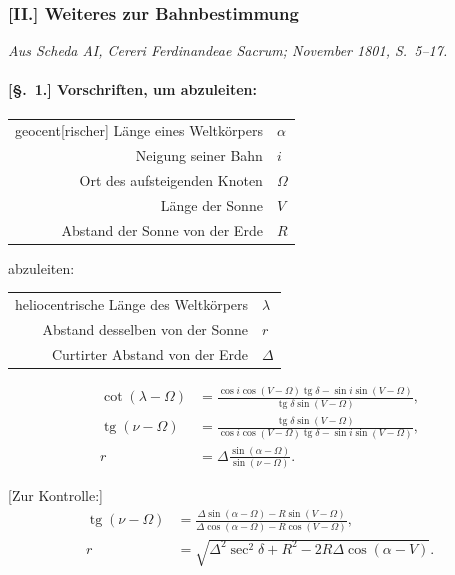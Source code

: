 \documentclass[12pt,a4paper]{article}
\DeclareMathOperator{\tg}{tg}
\theoremstyle{plain}
\theoremstyle{definition}
\theoremstyle{remark}
\begin{document}
\newpage

\subsubsection*{[II.] Weiteres zur Bahnbestimmung}

\textit{Aus Scheda AI, Cereri Ferdinandeae Sacrum; November 1801, S.~5--17.}

\medskip

\paragraph{[§.~1.] Vorschriften, um abzuleiten:}

\begin{center}
\begin{tabular}{r@{\quad}l}
geocent[rischer] Länge eines Weltkörpers & $\alpha$ \\
Neigung seiner Bahn & $i$ \\
Ort des aufsteigenden Knoten & $\Omega$ \\
Länge der Sonne & $V$ \\
Abstand der Sonne von der Erde & $R$
\end{tabular}
\end{center}

abzuleiten:
\begin{center}
\begin{tabular}{r@{\quad}l}
heliocentrische Länge des Weltkörpers & $\lambda$ \\
Abstand desselben von der Sonne & $r$ \\
Curtirter Abstand von der Erde & $\Delta$
\end{tabular}
\end{center}

\begin{align*}
\cot(\lambda - \Omega) &= \frac{\cos i \cos(V - \Omega) \tg\delta - \sin i \sin(V - \Omega)}{\tg\delta \sin(V - \Omega)}, \\
\tg(\nu - \Omega) &= \frac{\tg\delta \sin(V - \Omega)}{\cos i \cos(V - \Omega) \tg\delta - \sin i \sin(V - \Omega)}, \\
r &= \Delta \frac{\sin(\alpha - \Omega)}{\sin(\nu - \Omega)}.
\end{align*}

[Zur Kontrolle:]
\begin{align*}
\tg(\nu - \Omega) &= \frac{\Delta \sin(\alpha - \Omega) - R \sin(V - \Omega)}{\Delta \cos(\alpha - \Omega) - R \cos(V - \Omega)}, \\
r &= \sqrt{\Delta^2 \sec^2\delta + R^2 - 2R\Delta \cos(\alpha - V)}.
\end{align*}
\end{document}
